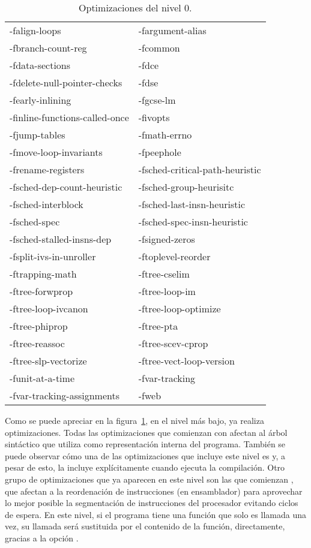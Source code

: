 \begin{table}[htb]
\begin{center}
	\begin{tabular}{|ll|}
		\hline
		-falign-loops & -fargument-alias\\
		-fbranch-count-reg & -fcommon\\
		-fdata-sections & -fdce\\
		-fdelete-null-pointer-checks & -fdse\\
		-fearly-inlining & -fgcse-lm\\
		-finline-functions-called-once & -fivopts\\
		-fjump-tables & -fmath-errno\\
		-fmove-loop-invariants & -fpeephole\\
		-frename-registers & -fsched-critical-path-heuristic\\
		-fsched-dep-count-heuristic & -fsched-group-heurisitc\\
		-fsched-interblock & -fsched-last-insn-heuristic\\
		-fsched-spec & -fsched-spec-insn-heuristic\\
		-fsched-stalled-insns-dep & -fsigned-zeros\\
		-fsplit-ivs-in-unroller & -ftoplevel-reorder\\
		-ftrapping-math & -ftree-cselim\\
		-ftree-forwprop & -ftree-loop-im\\
		-ftree-loop-ivcanon & -ftree-loop-optimize\\
		-ftree-phiprop & -ftree-pta\\
		-ftree-reassoc & -ftree-scev-cprop\\
		-ftree-slp-vectorize & -ftree-vect-loop-version\\
		-funit-at-a-time & -fvar-tracking\\
		-fvar-tracking-assignments & -fweb\\
		\hline
	\end{tabular}
\end{center}
\caption{Optimizaciones del nivel 0.}
\label{opt0}
\end{table}

Como se puede apreciar en la figura~\ref{opt0}, en el nivel más bajo,  ya realiza optimizaciones. Todas las optimizaciones que comienzan con  afectan al árbol sintáctico que utiliza  como representación interna del programa. También se puede observar cómo una de las optimizaciones que incluye este nivel es  y, a pesar de esto,  la incluye explícitamente cuando ejecuta la compilación. Otro grupo de optimizaciones que ya aparecen en este nivel son las que comienzan , que afectan a la reordenación de instrucciones (en ensamblador) para aprovechar lo mejor posible la segmentación de instrucciones del procesador evitando ciclos de espera. En este nivel, si el programa tiene una función que solo es llamada una vez, su llamada será sustituida por el contenido de la función, directamente, gracias a la opción .

